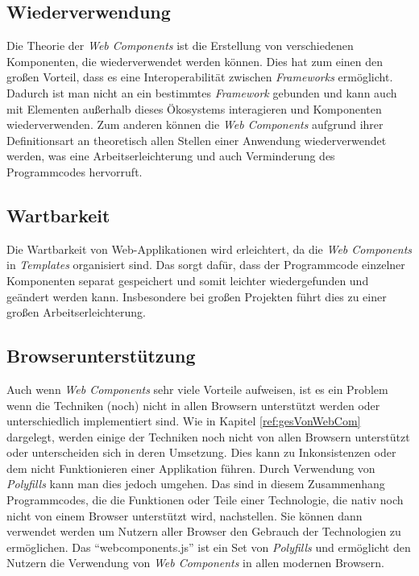 \documentclass[12pt, paper=a4, bibtotoc, toc=listof, headsepline=true]{scrreprt}
\begin{document}
			\subsection{Wiederverwendung}
			Die Theorie der \emph{Web Components} ist die Erstellung von verschiedenen Komponenten, die wiederverwendet werden können. Dies hat zum einen den großen Vorteil, dass es eine Interoperabilität zwischen \emph{Frameworks} ermöglicht\cite[S.2]{patel2015learning}. Dadurch ist man nicht an ein bestimmtes \emph{Framework} gebunden und kann auch mit Elementen außerhalb dieses Ökosystems interagieren und Komponenten wiederverwenden. Zum anderen können die \emph{Web Components} aufgrund ihrer Definitionsart an theoretisch allen Stellen einer Anwendung wiederverwendet werden, was eine Arbeitserleichterung und auch Verminderung des Programmcodes hervorruft. 
			\subsection{Wartbarkeit}
			Die Wartbarkeit von Web-Applikationen wird erleichtert, da die \emph{Web Components} in \emph{Templates} organisiert sind\cite[S.2]{patel2015learning}. Das sorgt dafür, dass der Programmcode einzelner Komponenten separat gespeichert und somit leichter wiedergefunden und geändert werden kann. Insbesondere bei großen Projekten führt dies zu einer großen Arbeitserleichterung.
			\subsection{Browserunterstützung}
			\label{sec:broUnt}
			Auch wenn \emph{Web Components} sehr viele Vorteile aufweisen, ist es ein Problem wenn die Techniken (noch) nicht in allen Browsern unterstützt werden oder unterschiedlich implementiert sind. Wie in Kapitel \ref{ref:gesVonWebCom} dargelegt, werden einige der Techniken noch nicht von allen Browsern unterstützt oder unterscheiden sich in deren Umsetzung. Dies kann zu Inkonsistenzen oder dem nicht Funktionieren einer Applikation führen. Durch Verwendung von  \emph{Polyfills} kann man dies jedoch umgehen. Das sind in diesem Zusammenhang Programmcodes, die die Funktionen oder Teile einer Technologie, die nativ noch nicht von einem Browser unterstützt wird, nachstellen. Sie können dann verwendet werden um Nutzern aller Browser den Gebrauch der Technologien zu ermöglichen\cite[S.4]{satrom2014building}. Das \enquote{webcomponents.js} ist ein Set von \emph{Polyfills} und ermöglicht den Nutzern die Verwendung von \emph{Web Components} in allen modernen Browsern\cite{webComJs}.
\end{document}
